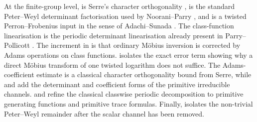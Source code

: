 At the finite-group level,
 is Serre's character
orthogonality \cite{Serre1977LinearRepresentations},
 is the standard
Peter--Weyl determinant factorisation used by
Noorani--Parry \cite{NooraniParry1992ChebotarevShifts}, and
 is a twisted
Perron--Frobenius input in the sense of Adachi--Sunada
\cite{AdachiSunada1987TwistedPerronFrobenius}. The class-function
linearisation  is the periodic
determinant linearisation already present in Parry--Pollicott
\cite{ParryPollicott1986Chebotarev}. The increment in
 is that ordinary M\"obius
inversion is corrected by Adams operations on class functions.
 isolates the exact error term
showing why a direct M\"obius transform of one twisted logarithm does
not suffice. The Adams-coefficient estimate
 is a classical character
orthogonality bound from Serre, while
 and
 add the determinant and
coefficient forms of the primitive irreducible channels.
 and
 refine the classical classwise
periodic decomposition to primitive generating functions and primitive
trace formulas. Finally,
 isolates the non-trivial
Peter--Weyl remainder after the scalar channel has been removed.


